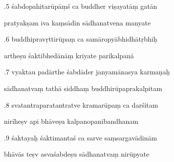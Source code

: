 \documentclass[article,12pt,a4paper]{memoir}%
\newcounter{parCount}
\begin{document}
	  
	  \pstart {}.5 śabdopahitarūpāṃś ca buddher viṣayatāṃ gatān 
	{}
	\pend%
      

	  
	  \pstart \leavevmode%
	pratyakṣam iva kaṃsādīn sādhanatvena manyate 
	{}
	\pend%
      

	  
	  \pstart {}.6 buddhipravṛttirūpaṃ ca samāropyābhidhātṛbhiḥ 
	{}
	\pend%
      

	  
	  \pstart \leavevmode%
	artheṣu śaktibhedānāṃ kriyate parikalpanā 
	{}
	\pend%
      

	  
	  \pstart {}.7 vyaktau padārthe śabdāder janyamānasya karmaṇaḥ 
	{}
	\pend%
      

	  
	  \pstart \leavevmode%
	sādhanatvaṃ tathā siddhaṃ buddhirūpaprakalpitam 
	{}
	\pend%
      

	  
	  \pstart {}.8 svatantraparatantratve kramarūpaṃ ca darśitam 
	{}
	\pend%
      

	  
	  \pstart \leavevmode%
	nirīheṣv api bhāveṣu kalpanopanibandhanam 
	{}
	\pend%
      

	  
	  \pstart {}.9 śaktayaḥ śaktimantaś ca sarve saṃsargavādinām 
	{}
	\pend%
      

	  
	  \pstart \leavevmode%
	bhāvās teṣv asvaśabdeṣu sādhanatvaṃ nirūpyate 
	{}
	\pend%
      
\end{document}
